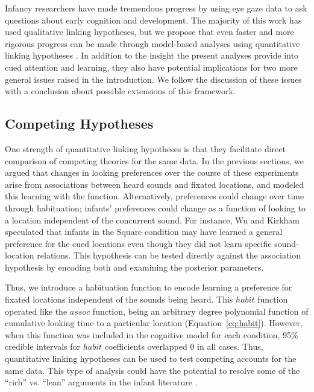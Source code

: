 \documentclass[12pt]{article}
\begin{document}
	Infancy researchers have made tremendous progress by using eye gaze data to ask questions about early cognition and development. The majority of this work has used qualitative linking hypotheses, but we propose that even faster and more rigorous progress can be made through model-based analyses using quantitative linking hypotheses \cite{Aslin2007, Teller1984}. In addition to the insight the present analyses provide into cued attention and learning, they also have potential implications for two more general issues raised in the introduction. We follow the discussion of these issues with a conclusion about possible extensions of this framework.

\subsection*{Competing Hypotheses}

	One strength of quantitative linking hypotheses is that they facilitate direct comparison of competing theories for the same data. In the previous sections, we argued that changes in looking preferences over the course of these experiments arise from associations between heard sounds and fixated locations, and modeled this learning with the  function. Alternatively, preferences could change over time through habituation; infants' preferences could change as a function of looking to a location independent of the concurrent sound. For instance, Wu and Kirkham \cite{Wu2010a} speculated that infants in the Square condition may have learned a general preference for the cued locations even though they did not learn specific sound-location relations. This hypothesis can be tested directly against the association hypothesis by encoding both and examining the posterior parameters.

	Thus, we introduce a habituation function to encode learning a preference for fixated locations independent of the sounds being heard. This $habit$ function operated like the $assoc$ function, being an arbitrary degree polynomial function of cumulative looking time to a particular location (Equation~\ref{eq:habit}). However, when this function was included in the cognitive model for each condition, 95\% credible intervals for $habit$ coefficients overlapped 0 in all cases. Thus, quantitative linking hypotheses can be used to test competing accounts for the same data. This type of analysis could have the potential to resolve some of the ``rich'' vs. ``lean'' arguments in the infant literature \cite{Spelke1998, Aslin2000, Munakata2000}.
\end{document}
